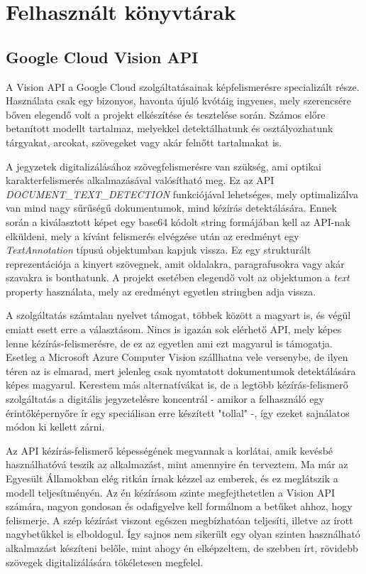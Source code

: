 \chapter{Felhasznált könyvtárak}

\section{Google Cloud Vision API}

A Vision API a Google Cloud szolgáltatásainak képfelismerésre specializált része. Használata csak egy bizonyos, havonta újuló kvótáig ingyenes, mely szerencsére bőven elegendő volt a projekt elkészítése és tesztelése során. Számos előre betanított modellt tartalmaz, melyekkel detektálhatunk és osztályozhatunk tárgyakat, arcokat, szövegeket vagy akár felnőtt tartalmakat is. \cite{Vision}

A jegyzetek digitalizálásához szövegfelismerésre van szükség, ami optikai karakterfelismerés alkalmazásával valósítható meg. Ez az API \emph{DOCUMENT\_TEXT\_DETECTION} funkciójával lehetséges, mely optimalizálva van mind nagy sűrűségű dokumentumok, mind kézírás detektálására. Ennek során a kiválasztott képet egy base64 kódolt string formájában kell az API-nak elküldeni, mely a kívánt felismerés elvégzése után az eredményt egy \emph{TextAnnotation} típusú objektumban kapjuk vissza. Ez egy strukturált reprezentációja a kinyert szövegnek, amit oldalakra, paragrafusokra vagy akár szavakra is bonthatunk. A projekt esetében elegendő volt az objektumon a \emph{text} property használata, mely az eredményt egyetlen stringben adja vissza. 

A szolgáltatás számtalan nyelvet támogat, többek között a magyart is, és végül emiatt esett erre a választásom. Nincs is igazán sok elérhető API, mely képes lenne kézírás-felismerésre, de ez az egyetlen ami ezt magyarul is támogatja. Esetleg a Microsoft Azure Computer Vision szállhatna vele versenybe, de ilyen téren az is elmarad, mert jelenleg csak nyomtatott dokumentumok detektálására képes magyarul. Kerestem más alternatívákat is, de a legtöbb kézírás-felismerő szolgáltatás a digitális jegyzetelésre koncentrál - amikor a felhasználó egy érintőképernyőre ír egy speciálisan erre készített "tollal" -, így ezeket sajnálatos módon ki kellett zárni.

Az API kézírás-felismerő képességének megvannak a korlátai, amik kevésbé használhatóvá teszik az alkalmazást, mint amennyire én terveztem. Ma már az Egyesült Államokban elég ritkán írnak kézzel az emberek, és ez meglátszik a modell teljesítményén. Az én kézírásom szinte megfejthetetlen a Vision API számára, nagyon gondosan és odafigyelve kell formálnom a betűket ahhoz, hogy felismerje. A szép kézírást viszont egészen megbízhatóan teljesíti, illetve az írott nagybetűkkel is elboldogul. Így sajnos nem sikerült egy olyan szinten használható alkalmazást készíteni belőle, mint ahogy én elképzeltem, de szebben írt, rövidebb szövegek digitalizálására tökéletesen megfelel. 

